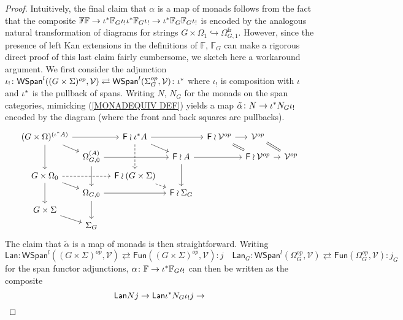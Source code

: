 \documentclass[a4paper,10pt]{article}%
\begin{document}
\begin{proof}
Intuitively, the final claim that 
$\alpha$ is a map of monads 
follows from the fact that the composite 
$
\mathbb{F} \mathbb{F}
	\to 
\iota^{\**} \mathbb{F}_G \iota_{!} \iota^{\**} \mathbb{F}_G \iota_{!}
	\to
\iota^{\**} \mathbb{F}_G \mathbb{F}_G \iota_{!}
$
is encoded by the analogous natural transformation of diagrams for strings $G \times \Omega_1 \hookrightarrow \Omega_{G,1}^{\text{fr}}$.
However, since the presence of left Kan extensions in the 
definitions of $\mathbb{F}$, $\mathbb{F}_G$
can make a rigorous direct proof of this last claim fairly cumbersome, we sketch here a workaround argument.
We first consider the adjunction
$
	\iota_{!} \colon
	\mathsf{WSpan}^l((G\times \Sigma)^{op},\mathcal{V})
		\rightleftarrows
	\mathsf{WSpan}^l(\Sigma_G^{op},\mathcal{V})
	\colon \iota^{\**}
$
where $\iota_!$ is composition with $\iota$ and $\iota^{\**}$ is the pullback of spans. 
Writing $N$, $N_G$ for the monads 
on the span categories, mimicking (\ref{MONADEQUIV DEF}) yields
a map 
$\tilde{\alpha} \colon N \to \iota^{\**} N_G \iota_{!}$
encoded by the diagram (where the front and back squares are pullbacks).
\[
\begin{tikzcd}[row sep=3pt, column sep =8pt]
	(G \times \Omega)^{(\iota^{\**} A)}	\ar{dd} \ar{rd} \ar{rr} &&
	\Fin \wr \iota^{\**} A \ar{rd} \ar[dashed]{dd} \ar{rr}&&
	\Fin \wr \mathcal{V}^{op} \ar{r} \ar[equal]{rd} &
	\mathcal{V}^{op} \ar[equal]{rd}
\\
	& \Omega_{G,0}^{(A)} \ar{dd} \ar{rr} &&
	\Fin \wr A \ar{dd} \ar{rr} &&
	\Fin \wr \mathcal{V}^{op} \ar{r} &
	\mathcal{V}^{op}
\\
	G \times \Omega_0	\ar{dd} \ar{rd} \ar[dashed]{rr}&&
	\Fin \wr (G \times \Sigma) \ar[dashed]{rd}
\\
	& \Omega_{G,0} \ar{dd} \ar{rr} &&
	\Fin \wr \Sigma_G
\\
	G \times \Sigma \ar{rd}
\\
	& \Sigma_{G}
\end{tikzcd}
\]
The claim that $\tilde{\alpha}$ is a map of monads is then straightforward. Writing
\[
	\mathsf{Lan} \colon
	\mathsf{WSpan}^l((G\times \Sigma)^{op},\mathcal{V})
		\rightleftarrows
	\mathsf{Fun}((G\times \Sigma)^{op},\mathcal{V})
	\colon j
\quad
	\mathsf{Lan}_G \colon
	\mathsf{WSpan}^l(\Omega_G^{op},\mathcal{V})
		\rightleftarrows
	\mathsf{Fun}(\Omega_G^{op},\mathcal{V})
	\colon j_G
\]
for the span functor adjunctions,  
$\alpha \colon \mathbb{F} \to \iota^{\**} \mathbb{F}_G \iota_{!}$ can then be written as the composite
\[
	\mathsf{Lan} N j \to 
	\mathsf{Lan} \iota^{\**} N_G \iota_! j  \to
\]
\end{proof}
\end{document}
